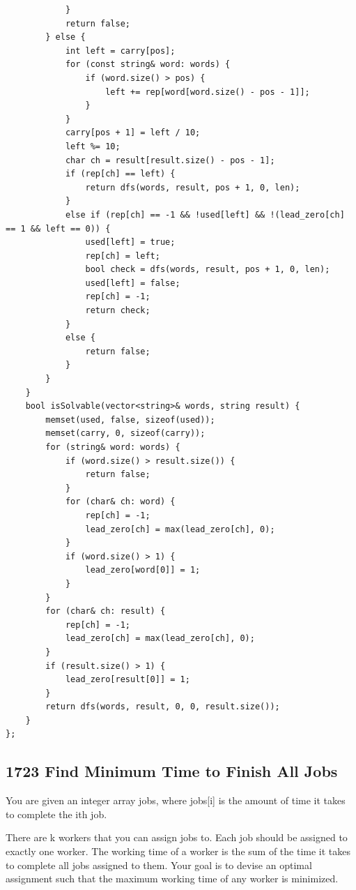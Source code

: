 \documentclass[9pt, b5paaper]{book}
\begin{document}
\begin{enumerate}
\begin{itemize}
\begin{itemize}
\begin{itemize}
\begin{verbatim}
            }
            return false;
        } else {
            int left = carry[pos];
            for (const string& word: words) {
                if (word.size() > pos) {
                    left += rep[word[word.size() - pos - 1]];
                }
            }
            carry[pos + 1] = left / 10;
            left %= 10;
            char ch = result[result.size() - pos - 1];
            if (rep[ch] == left) {
                return dfs(words, result, pos + 1, 0, len);
            }
            else if (rep[ch] == -1 && !used[left] && !(lead_zero[ch] == 1 && left == 0)) {
                used[left] = true;
                rep[ch] = left;
                bool check = dfs(words, result, pos + 1, 0, len);
                used[left] = false;
                rep[ch] = -1;
                return check;
            }
            else {
                return false;
            }
        }
    }
    bool isSolvable(vector<string>& words, string result) {
        memset(used, false, sizeof(used));
        memset(carry, 0, sizeof(carry));
        for (string& word: words) {
            if (word.size() > result.size()) {
                return false;
            }
            for (char& ch: word) {
                rep[ch] = -1;
                lead_zero[ch] = max(lead_zero[ch], 0);
            }
            if (word.size() > 1) {
                lead_zero[word[0]] = 1;
            }
        }
        for (char& ch: result) {
            rep[ch] = -1;
            lead_zero[ch] = max(lead_zero[ch], 0);
        }
        if (result.size() > 1) {
            lead_zero[result[0]] = 1;
        }
        return dfs(words, result, 0, 0, result.size());
    }
};
\end{verbatim}
\end{itemize}
\end{itemize}
\end{itemize}
\end{enumerate}
\subsection{1723 Find Minimum Time to Finish All Jobs}
\label{sec-8-0-4}
You are given an integer array jobs, where jobs[i] is the amount of time it takes to complete the ith job.

There are k workers that you can assign jobs to. Each job should be assigned to exactly one worker. The working time of a worker is the sum of the time it takes to complete all jobs assigned to them. Your goal is to devise an optimal assignment such that the maximum working time of any worker is minimized.
\end{document}
